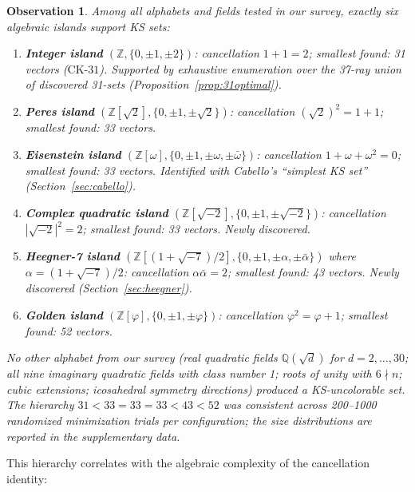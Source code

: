 \documentclass[12pt,a4paper]{article}
\newtheorem{observation}[theorem]{Observation}
\newcommand{\Z}{\mathbb{Z}}
\newcommand{\Q}{\mathbb{Q}}
\newcommand{\CK}{\mathrm{CK}\text{-}31}
\begin{document}
\begin{observation}\label{obs:islands}
Among all alphabets and fields tested in our survey, exactly six algebraic islands support KS sets:
\begin{enumerate}[label=(\arabic*)]
    \item \textbf{Integer island} $(\Z, \{0,\pm 1,\pm 2\})$: cancellation $1 + 1 = 2$; smallest found: 31 vectors ($\CK$). Supported by exhaustive enumeration over the 37-ray union of discovered 31-sets (Proposition~\ref{prop:31optimal}).
    \item \textbf{Peres island} $(\Z[\sqrt{2}], \{0,\pm 1,\pm\sqrt{2}\})$: cancellation $(\sqrt{2})^2 = 1 + 1$; smallest found: 33 vectors.
    \item \textbf{Eisenstein island} $(\Z[\omega], \{0,\pm 1,\pm\omega,\pm\bar\omega\})$: cancellation $1 + \omega + \omega^2 = 0$; smallest found: 33 vectors. Identified with Cabello's ``simplest KS set''~\cite{Cabello2025simplest} (Section~\ref{sec:cabello}).
    \item \textbf{Complex quadratic island} $(\Z[\sqrt{-2}], \{0,\pm 1,\pm\sqrt{-2}\})$: cancellation $|\sqrt{-2}|^2 = 2$; smallest found: 33 vectors. Newly discovered.
    \item \textbf{Heegner-7 island} $(\Z[(1+\sqrt{-7})/2], \{0,\pm 1,\pm\alpha,\pm\bar\alpha\})$ where $\alpha = (1+\sqrt{-7})/2$: cancellation $\alpha\bar\alpha = 2$; smallest found: 43 vectors. Newly discovered (Section~\ref{sec:heegner}).
    \item \textbf{Golden island} $(\Z[\varphi], \{0,\pm 1,\pm\varphi\})$: cancellation $\varphi^2 = \varphi + 1$; smallest found: 52 vectors.
\end{enumerate}
No other alphabet from our survey (real quadratic fields $\Q(\sqrt{d})$ for $d = 2,\ldots,30$; all nine imaginary quadratic fields with class number 1; roots of unity with $6\nmid n$; cubic extensions; icosahedral symmetry directions) produced a KS-uncolorable set. The hierarchy $31 < 33 = 33 = 33 < 43 < 52$ was consistent across 200--1000 randomized minimization trials per configuration; the size distributions are reported in the supplementary data.
\end{observation}

This hierarchy correlates with the algebraic complexity of the cancellation identity:
\end{document}
